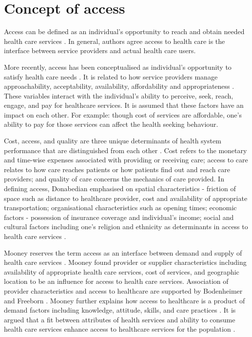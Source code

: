 \section{Concept of access}

Access can be defined as an individual's opportunity to reach and obtain needed health care services \cite{levesque2013patient}. In general, authors agree access to health care is the interface between service providers and actual health care users. 

More recently, access has been conceptualised as individual's opportunity to satisfy health care needs \cite{levesque2013patient}. It is related to how service providers manage approachability, acceptability, availability, affordability and appropriateness \cite{levesque2013patient}. These variables interact with the individual's ability to perceive, seek, reach, engage, and pay for healthcare services. It is assumed that these factors have an impact on each other. For example: though cost of services are affordable, one's ability to pay for those services can affect the health seeking behaviour.

Cost, access, and quality are three unique determinants of health system performance that are distinguished from each other \cite{donabedian2002introduction}. Cost refers to the monetary and time-wise expenses associated with providing or receiving care; access to care relates to how care reaches patients or how patients find out and reach care providers; and quality of care concerns the mechanics of care provided. In defining access, Donabedian emphasised on spatial characteristics - friction of space such as distance to healthcare provider, cost and availability of appropriate transportation; organisational characteristics such as opening times; economic factors - possession of insurance coverage and individual's income; social and cultural factors including one's religion and  ethnicity as determinants in access to health care services \cite{donabedian2002introduction, donabedian1973aspects}.

Mooney reserves the term access as an interface between demand and supply of health care services \cite{mooney1983equity}. Mooney found provider or supplier characteristics including availability of appropriate health care services, cost of services, and geographic location to be an influence for access to health care services. Association of provider characteristics and access to healthcare are supported by Bodenheimer and Freeborn \cite{bodenheimer1970patterns,freeborn1973evaluation}. Mooney further explains how access to healthcare is a product of demand factors including knowledge, attitude, skills, and care practices \cite{mooney1983equity}. It is argued that a fit between attributes of health services and ability to consume health care services enhance access to healthcare services for the population \cite{mooney1983equity}. 


